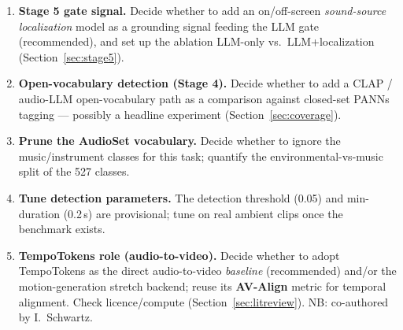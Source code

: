 \documentclass[11pt,a4paper]{article}
\begin{document}
\begin{enumerate}[label=\textbf{A\arabic*.}]
  \item \textbf{Stage 5 gate signal.} Decide whether to add an on/off-screen \emph{sound-source
    localization} model as a grounding signal feeding the LLM gate (recommended), and set up the
    ablation LLM-only vs.\ LLM+localization (Section~\ref{sec:stage5}).
  \item \textbf{Open-vocabulary detection (Stage 4).} Decide whether to add a CLAP / audio-LLM
    open-vocabulary path as a comparison against closed-set PANNs tagging --- possibly a headline
    experiment (Section~\ref{sec:coverage}).
  \item \textbf{Prune the AudioSet vocabulary.} Decide whether to ignore the music/instrument classes
    for this task; quantify the environmental-vs-music split of the 527 classes.
  \item \textbf{Tune detection parameters.} The detection threshold (0.05) and min-duration (0.2\,s)
    are provisional; tune on real ambient clips once the benchmark exists.
  \item \textbf{TempoTokens role (audio-to-video).} Decide whether to adopt TempoTokens
    \cite{tempotokens} as the direct audio-to-video \emph{baseline} (recommended) and/or the
    motion-generation stretch backend; reuse its \textbf{AV-Align} metric for temporal alignment.
    Check licence/compute (Section~\ref{sec:litreview}). NB: co-authored by I.\ Schwartz.
\end{enumerate}

\end{document}
